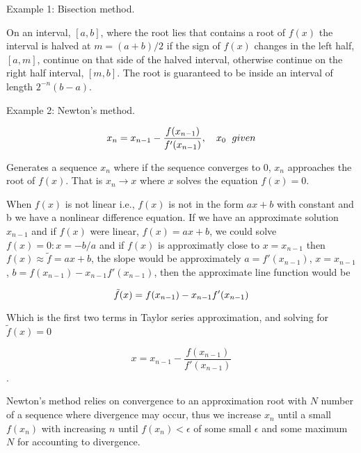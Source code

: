 \documentclass[11pt]{article}
\begin{document}
Example 1: Bisection method.

On an interval, \([a, b]\), where the root lies that contains a root of
\(f(x)\) the interval is halved at \(m=(a+b)/2\) if the sign of \(f(x)\)
changes in the left half, \([a, m]\), continue on that side of the
halved interval, otherwise continue on the right half interval,
\([m, b]\). The root is guaranteed to be inside an interval of length
\(2^{-n}(b-a)\).

Example 2: Newton's method.

\[x_n = x_{n-1} - 
  \frac{f(x_{n-1})}{f'(x_{n-1})}, 
  \quad x_{0} \hspace{6 px} given \\ \\ \]

Generates a sequence \(x_n\) where if the sequence converges to 0,
\(x_n\) approaches the root of \(f(x)\). That is \(x_n \rightarrow x\)
where \(x\) solves the equation \(f(x) = 0\).

When \(f(x)\) is not linear i.e., \(f(x)\) is not in the form \(ax+b\)
with constant and b we have a nonlinear difference equation. If we have
an approximate solution \(x_{n-1}\) and if \(f(x)\) were linear,
\(f(x) = ax+b\), we could solve \(f(x) = 0:x = -b/a\) and if \(f(x)\) is
approximatly close to \(x = x_{n-1}\) then
\(f(x) \approx \tilde{f} = ax+b\), the slope would be approximately
\(a = f'(x_{n-1})\), \(x = x_{n-1}\),
\(b=f(x_{n-1})-x_{n-1}f'(x_{n-1})\), then the approximate line function
would be

\[\tilde{f}(x)=f(x_{n-1})-x_{n-1}f'(x_{n-1}) \\ \\ \]

Which is the first two terms in Taylor series approximation, and solving
for \(\tilde{f}(x)=0\)

\[x=x_{n-1}-\frac{f(x_{n-1})}{f'(x_{n-1})}\].

Newton's method relies on convergence to an approximation root with
\(N\) number of a sequence where divergence may occur, thus we increase
\(x_n\) until a small \(f(x_n)\) with increasing \(n\) until
\(f(x_n) < \epsilon\) of some small \(\epsilon\) and some maximum \(N\)
for accounting to divergence.
\end{document}
